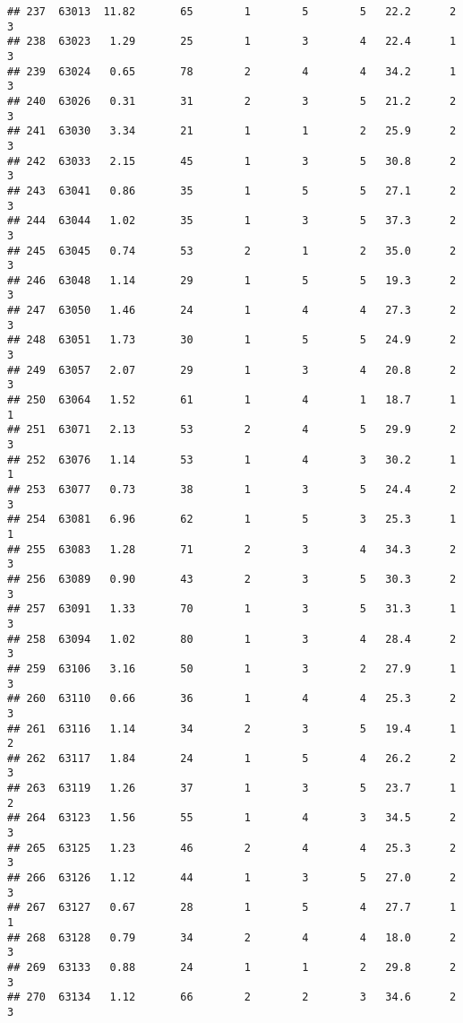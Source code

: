 \documentclass[
]{article}
\begin{document}
\begin{verbatim}
## 237  63013  11.82       65        1        5        5   22.2      2      3
## 238  63023   1.29       25        1        3        4   22.4      1      3
## 239  63024   0.65       78        2        4        4   34.2      1      3
## 240  63026   0.31       31        2        3        5   21.2      2      3
## 241  63030   3.34       21        1        1        2   25.9      2      3
## 242  63033   2.15       45        1        3        5   30.8      2      3
## 243  63041   0.86       35        1        5        5   27.1      2      3
## 244  63044   1.02       35        1        3        5   37.3      2      3
## 245  63045   0.74       53        2        1        2   35.0      2      3
## 246  63048   1.14       29        1        5        5   19.3      2      3
## 247  63050   1.46       24        1        4        4   27.3      2      3
## 248  63051   1.73       30        1        5        5   24.9      2      3
## 249  63057   2.07       29        1        3        4   20.8      2      3
## 250  63064   1.52       61        1        4        1   18.7      1      1
## 251  63071   2.13       53        2        4        5   29.9      2      3
## 252  63076   1.14       53        1        4        3   30.2      1      1
## 253  63077   0.73       38        1        3        5   24.4      2      3
## 254  63081   6.96       62        1        5        3   25.3      1      1
## 255  63083   1.28       71        2        3        4   34.3      2      3
## 256  63089   0.90       43        2        3        5   30.3      2      3
## 257  63091   1.33       70        1        3        5   31.3      1      3
## 258  63094   1.02       80        1        3        4   28.4      2      3
## 259  63106   3.16       50        1        3        2   27.9      1      3
## 260  63110   0.66       36        1        4        4   25.3      2      3
## 261  63116   1.14       34        2        3        5   19.4      1      2
## 262  63117   1.84       24        1        5        4   26.2      2      3
## 263  63119   1.26       37        1        3        5   23.7      1      2
## 264  63123   1.56       55        1        4        3   34.5      2      3
## 265  63125   1.23       46        2        4        4   25.3      2      3
## 266  63126   1.12       44        1        3        5   27.0      2      3
## 267  63127   0.67       28        1        5        4   27.7      1      1
## 268  63128   0.79       34        2        4        4   18.0      2      3
## 269  63133   0.88       24        1        1        2   29.8      2      3
## 270  63134   1.12       66        2        2        3   34.6      2      3

\end{verbatim}
\end{document}
